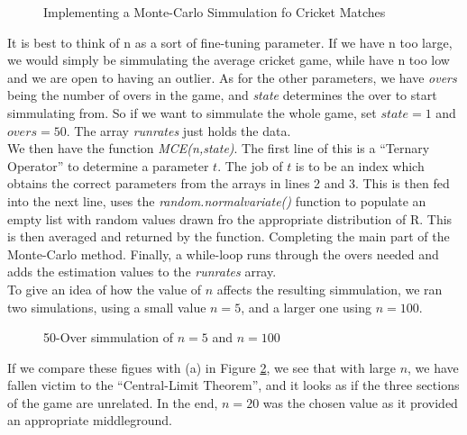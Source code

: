 \begin{figure}[h] %
    \label{mcecode}
    
    \caption{Implementing a Monte-Carlo Simmulation fo Cricket Matches}
\end{figure}

It is best to think of n as a sort of fine-tuning parameter. If we have n too large, we would simply be simmulating the average cricket game, while have n too low and 
we are open to having an outlier. As for the other parameters, we have \textit{overs} being the number of overs in the game, and \textit{state} determines the over to start 
simmulating from. So if we want to simmulate the whole game, set $state=1$ and $overs=50$. The array \textit{runrates} just holds the data.\\

We then have the function \textit{MCE(n,state)}. The first line of this is a ``Ternary Operator'' to determine a parameter $t$. The job of $t$ is to be an index which obtains 
the correct parameters from the arrays in lines 2 and 3. This is then fed into the next line, uses the \textit{random.normalvariate()} function to populate an empty list with random 
values drawn fro the appropriate distribution of R. This is then averaged and returned by the function. Completing the main part of the Monte-Carlo method.
Finally, a while-loop runs through the overs needed and adds the estimation values to the \textit{runrates} array. \\

To give an idea of how the value of $n$ affects the resulting simmulation, we ran two simulations, using a small value $n=5$, and a larger one using $n=100$. 

\begin{figure}[h]
    \centering
    \qquad
    \caption{50-Over simmulation of $n=5$ and $n=100$}
    \label{MeanAndSDRR}
\end{figure}

If we compare these figues with (a) in Figure \ref{MeanAndSDRR}, we see that with large $n$, we have fallen victim to the ``Central-Limit Theorem'', and it looks as if the three 
sections of the game are unrelated. In the end, $n=20$ was the chosen value as it provided an appropriate middleground. 